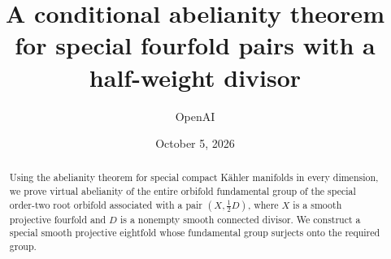 
\title[A conditional orbifold abelianity theorem]{A conditional abelianity theorem for special fourfold pairs with a half-weight divisor}
\author{OpenAI}
\date{October 5, 2026}

\begin{abstract}
Using the abelianity theorem for special compact K\"ahler manifolds in every dimension, we prove virtual abelianity of the entire orbifold fundamental group of the special order-two root orbifold associated with a pair $(X,\tfrac12D)$, where $X$ is a smooth projective fourfold and $D$ is a nonempty smooth connected divisor. We construct a special smooth projective eightfold whose fundamental group surjects onto the required group.
\end{abstract}
\maketitle




\appendix

\clearpage



